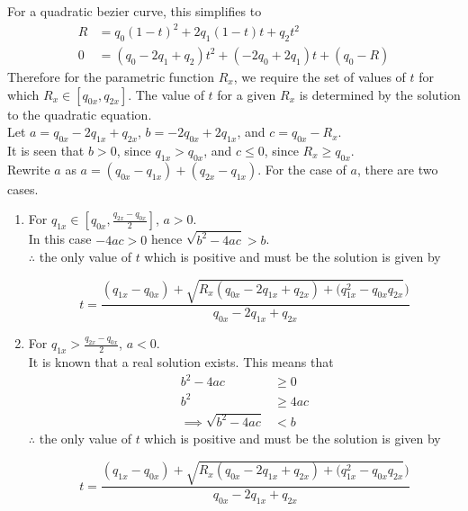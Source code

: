 \documentclass[a4paper,11pt]{ijamas}
\begin{document}
For a quadratic bezier curve, this simplifies to
\begin{align*}
	R &= q_0(1-t)^2 + 2q_1(1-t)t + q_2t^2 \\
	0 &= (q_0-2q_1+q_2)t^2 + (-2q_0+2q_1)t + (q_0-R)
\end{align*}
Therefore for the parametric function $R_x$, we require the set of values of $t$ for which $R_x \in [q_{0x},q_{2x}]$. The value of $t$ for a given $R_x$ is determined by the solution to the quadratic equation.\\
Let $a=q_{0x}-2q_{1x}+q_{2x}$, $b=-2q_{0x}+2q_{1x}$, and $c=q_{0x}-R_x$.\\
It is seen that $b>0$, since $q_{1x} > q_{0x}$, and $c \leq 0$, since $R_x \geq q_{0x}$.\\
Rewrite $a$ as $a=(q_{0x}-q_{1x}) + (q_{2x}-q_{1x})$.
For the case of $a$, there are two cases.\\
\begin{enumerate}
\item
For $q_{1x} \in [q_{0x}, \frac{q_{2x}-q_{0x}}{2}]$, $a>0$.\\
In this case $-4ac>0$ hence $\sqrt{b^2-4ac}>b$.\\
$\therefore$ the only value of $t$ which is positive and must be the solution is given by

\begin{equation}\label{qt1}
 t =  \frac{(q_{1x}-q_{0x})+\sqrt{R_x(q_{0x}-2q_{1x}+q_{2x})+(q_{1x}^2-q_{0x}q_{2x}})}
		{q_{0x}-2q_{1x}+q_{2x}}
\end{equation}



\item
For $q_{1x}>\frac{q_{2x}-q_{0x}}{2}$, $a<0$.\\
It is known that a real solution exists. This means that
\begin{align*}
	b^2 -4ac &\geq 0 \\
	b^2 &\geq 4ac \\
	\implies \sqrt{b^2-4ac} &< b
\end{align*}
$\therefore$ the only value of $t$ which is positive and must be the solution is given by

\begin{equation}\label{qt2}
 t =  \frac{(q_{1x}-q_{0x})+\sqrt{R_x(q_{0x}-2q_{1x}+q_{2x})+(q_{1x}^2-q_{0x}q_{2x}})}
		{q_{0x}-2q_{1x}+q_{2x}}
\end{equation}


\end{enumerate}
\end{document}
